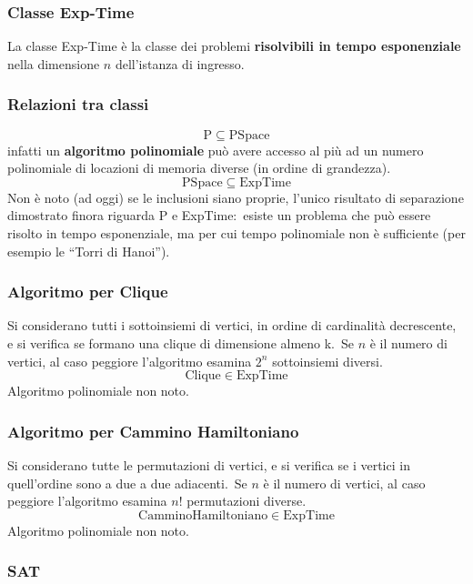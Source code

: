 \subsubsection{Classe Exp-Time}

La classe Exp-Time è la classe dei problemi \textbf{risolvibili in tempo esponenziale} nella dimensione $n$ dell'istanza di ingresso.\

\subsubsection{Relazioni tra classi}

\[\mathrm{P} \subseteq \mathrm{PSpace}\]
infatti un \textbf{algoritmo polinomiale} può avere accesso al più ad un numero polinomiale di locazioni di memoria diverse (in ordine di grandezza).\
\[\mathrm{PSpace} \subseteq \mathrm{ExpTime}\]
Non è noto (ad oggi) se le inclusioni siano proprie, l'unico risultato di separazione dimostrato finora riguarda P e ExpTime:\ esiste un problema che può essere risolto in tempo esponenziale, ma per cui tempo polinomiale non è sufficiente (per esempio le ``Torri di Hanoi'').\

\subsubsection{Algoritmo per Clique}

Si considerano tutti i sottoinsiemi di vertici, in ordine di cardinalità decrescente, e si verifica se formano una clique di dimensione almeno k.\
Se $n$ è il numero di vertici, al caso peggiore l'algoritmo esamina $2^n$ sottoinsiemi diversi.\
\[\mathrm{Clique} \in \mathrm{ExpTime}\]
Algoritmo polinomiale non noto.

\subsubsection{Algoritmo per Cammino Hamiltoniano}

Si considerano tutte le permutazioni di vertici, e si verifica se i vertici in quell'ordine sono a due a due adiacenti.\
Se $n$ è il numero di vertici, al caso peggiore l'algoritmo esamina $n!$ permutazioni diverse.\
\[\mathrm{Cammino Hamiltoniano} \in \mathrm{ExpTime}\]
Algoritmo polinomiale non noto.\

\subsubsection{SAT}

